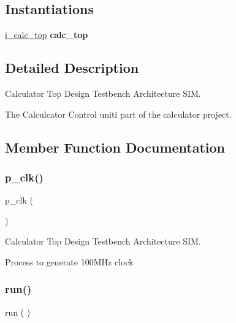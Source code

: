 \subsection*{Instantiations}
 \begin{DoxyCompactItemize}
\item 
\hyperlink{classtb__calc__top_1_1sim_a9d94f43f1c86cad501d82e9d726bc326}{i\+\_\+calc\+\_\+top}  {\bfseries calc\+\_\+top}   
\end{DoxyCompactItemize}


\subsection{Detailed Description}
Calculator Top Design Testbench Architecture S\+IM. 

The Calculcator Control uniti part of the calculator project. 

\subsection{Member Function Documentation}
\mbox{\label{classtb__calc__top_1_1sim_af35c81fcf5e4601a4e5d669b422cf79a}} 
\subsubsection{\texorpdfstring{p\+\_\+clk()}{p\_clk()}}
{\footnotesize\ttfamily p\+\_\+clk (\begin{DoxyParamCaption}{ }\end{DoxyParamCaption})}



Calculator Top Design Testbench Architecture S\+IM. 

Process to generate 100\+M\+Hz clock \mbox{\label{classtb__calc__top_1_1sim_a0f40b896b2461e250ebafd4e27b8ff54}} 
\subsubsection{\texorpdfstring{run()}{run()}}
{\footnotesize\ttfamily  {\bfseries \textcolor{vhdlchar}{ }} run ( ) \hspace{0.3cm}{\ttfamily [Process]}}



